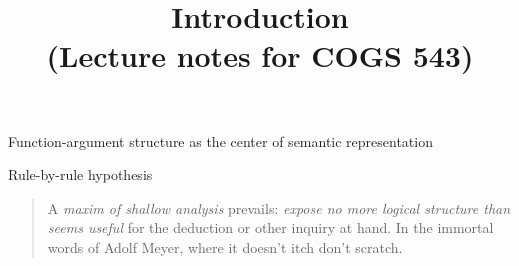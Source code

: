 \documentclass[11pt,a4paper,draft]{article}
\title{Introduction \\ \small (Lecture notes for COGS 543)}
\begin{document}
\maketitle

Function-argument structure as the center of semantic representation \cite{chierchia84}

\cite{carlson77}

Rule-by-rule hypothesis


\begin{quote}
A \emph{maxim of shallow analysis} prevails: \emph{expose no more logical structure than seems useful} for the deduction or other inquiry at hand. In the immortal words of Adolf Meyer, where it doesn't itch don't scratch. 
\end{quote}





\end{document}
